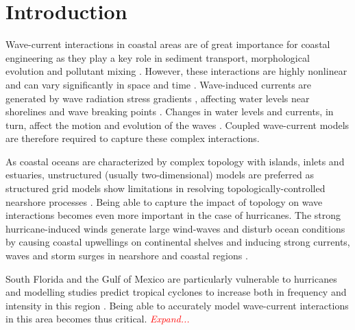 \documentclass[preprint,12pt,authoryear]{elsarticle}
\newcommand{\emphc}[1]{\emph{\textcolor{red}{#1}}}
\begin{document}
\linenumbers

\section{Introduction}

Wave-current interactions in coastal areas are of great importance for coastal engineering as they play a key role in sediment transport, morphological evolution and pollutant mixing \citep{bever2013simulating, li1998three}. However, these interactions are highly nonlinear and can vary significantly in space and time \citep{wu2011fvcom}. Wave-induced currents are generated by wave radiation stress gradients \citep{longuet1970longshore}, affecting water levels near shorelines and wave breaking points \citep{longuet1964radiation}. Changes in water levels and currents, in turn, affect the motion and evolution of the waves \citep{sikiric2013coupling}. Coupled wave-current models are therefore required to capture these complex interactions.

As coastal oceans are characterized by complex topology with islands, inlets and estuaries, unstructured (usually two-dimensional) models are preferred as structured grid models show limitations in resolving topologically-controlled nearshore processes \citep{wu2011fvcom, chen2007finite}. Being able to capture the impact of topology on wave interactions becomes even more important in the case of hurricanes. The strong hurricane-induced winds generate large wind-waves and disturb ocean conditions \citep{liu2020impacts} by causing coastal upwellings on continental shelves \citep{smith1982response} and inducing strong currents, waves and storm surges in nearshore and coastal regions \citep{dietrich2010high, weisberg2006hurricane}. 

South Florida and the Gulf of Mexico are particularly vulnerable to hurricanes \citep{malmstadt2009florida} and modelling studies predict tropical cyclones to increase both in frequency and intensity in this region \citep{marsooli2019climate, knutson2010tropical}. Being able to accurately model wave-current interactions in this area becomes thus critical. \emphc{Expand...}
\end{document}
